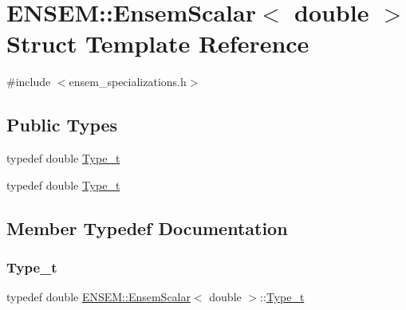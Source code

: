 \hypertarget{structENSEM_1_1EnsemScalar_3_01double_01_4}{}\section{E\+N\+S\+EM\+:\+:Ensem\+Scalar$<$ double $>$ Struct Template Reference}
\label{structENSEM_1_1EnsemScalar_3_01double_01_4}


{\ttfamily \#include $<$ensem\+\_\+specializations.\+h$>$}

\subsection*{Public Types}
\begin{DoxyCompactItemize}
\item 
typedef double \mbox{\hyperlink{structENSEM_1_1EnsemScalar_3_01double_01_4_a4f1860ca5dda43a72f79631b986d414e}{Type\+\_\+t}}
\item 
typedef double \mbox{\hyperlink{structENSEM_1_1EnsemScalar_3_01double_01_4_a4f1860ca5dda43a72f79631b986d414e}{Type\+\_\+t}}
\end{DoxyCompactItemize}


\subsection{Member Typedef Documentation}
\mbox{\label{structENSEM_1_1EnsemScalar_3_01double_01_4_a4f1860ca5dda43a72f79631b986d414e}} 
\subsubsection{\texorpdfstring{Type\_t}{Type\_t}\hspace{0.1cm}{\footnotesize\ttfamily [1/2]}}
{\footnotesize\ttfamily typedef double \mbox{\hyperlink{structENSEM_1_1EnsemScalar}{E\+N\+S\+E\+M\+::\+Ensem\+Scalar}}$<$ double $>$\+::\mbox{\hyperlink{structENSEM_1_1EnsemScalar_3_01double_01_4_a4f1860ca5dda43a72f79631b986d414e}{Type\+\_\+t}}}

\mbox{\label{structENSEM_1_1EnsemScalar_3_01double_01_4_a4f1860ca5dda43a72f79631b986d414e}} 
